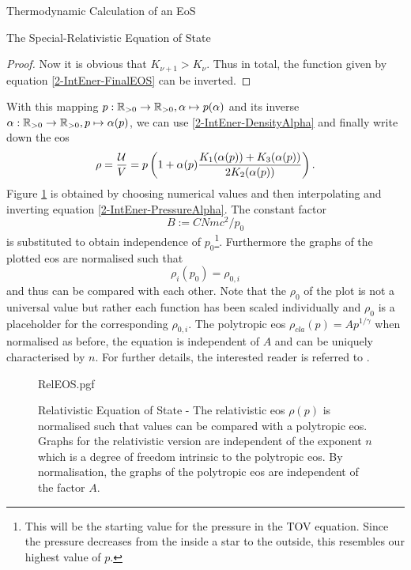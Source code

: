\begin{section}{Thermodynamic Calculation of an EoS}
\begin{subsection}{The Special-Relativistic Equation of State}
\begin{proof}
	Now it is obvious that $K_{\nu+1}>K_\nu$.
	Thus in total, the function given by equation \eqref{2-IntEner-FinalEOS} can be inverted.
\end{proof}%
%
%
\noindent With this mapping $p:\mathbb{R}_{>0}\rightarrow \mathbb{R}_{>0},\alpha\mapsto p(\alpha)$ and its inverse $\alpha:\mathbb{R}_{>0}\rightarrow \mathbb{R}_{>0},p\mapsto \alpha(p)$, we can use \eqref{2-IntEner-DensityAlpha} and finally write down the \ac{eos} 
\begin{equation}
	\rho = \frac{\mathcal{U}}{V} = p\left(1+\alpha(p)\frac{K_1(\alpha(p))+K_3(\alpha(p))}{2K_2(\alpha(p))}\right).
	\label{2-IntEner-FinalEOS}
\end{equation}
Figure \ref{2-IntEner-RelEOSPlot} is obtained by choosing numerical values and then interpolating and inverting equation \eqref{2-IntEner-PressureAlpha}.
The constant factor
\begin{equation}
	B:=CNmc^2/p_0
	\label{2-IntEner-FactorExplanation}
\end{equation}
is substituted to obtain independence of $p_0$\footnote{This will be the starting value for the pressure in the \acl{TOV} equation. Since the pressure decreases from the inside a star to the outside, this resembles our highest value of $p$.}.
Furthermore the graphs of the plotted \ac{eos} are normalised such that
\begin{equation}
	\rho_{i}(p_0)=\rho_{0,i}
\end{equation}
and thus can be compared with each other.
Note that the $\rho_0$ of the plot is not a universal value but rather each function has been scaled individually and $\rho_0$ is a placeholder for the corresponding $\rho_{0,i}$.
The polytropic \ac{eos} $\rho_{cla}(p)=Ap^{1/\gamma}$ when normalised as before, the equation is independent of $A$ and can be uniquely characterised by $n$. %
For further details, the interested reader is referred to \cite{pleyerGithubRepositoryJonas2021}.
\begin{figure}[H]
	\centering
	{RelEOS.pgf}
	\caption[Relativistic Equation of State]{Relativistic Equation of State -
	The relativistic \ac{eos} $\rho(p)$ is normalised such that values can be compared with a polytropic \ac{eos}.
	Graphs for the relativistic version are independent of the exponent $n$ which is a degree of freedom intrinsic to the polytropic \ac{eos}.
	By normalisation, the graphs of the polytropic \ac{eos} are independent of the factor $A$.}
	\label{2-IntEner-RelEOSPlot}
\end{figure}
\end{subsection}
%
%
%
%
%
%
\end{section}
